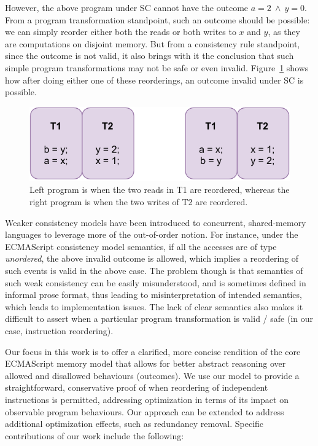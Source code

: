     
    However, the above program under SC cannot have the outcome $a=2\ \wedge\ y=0$. 
    From a program transformation standpoint, such an outcome should be possible: we can simply reorder either both the reads or both writes to $x$ and $y$, as they are computations on disjoint memory. 
    But from a consistency rule standpoint, since the outcome is not valid, it also brings with it the conclusion that such simple program transformations may not be safe or even invalid.
    Figure~\ref{intro:Example2} shows how after doing either one of these reorderings, an outcome invalid under SC is possible. 
    \begin{figure}[H]
        \centering
        \includegraphics[scale=0.7]{Program_Transform_Example.pdf}
        \caption{Left program is when the two reads in T1 are reordered, whereas the right program is when the two writes of T2 are reordered.}
        \label{intro:Example2}
    \end{figure}
    
    
    Weaker consistency models have been introduced to concurrent, shared-memory languages to leverage more of the \textit{}{out-of-order} notion. 
    For instance,  under the ECMAScript consistency model semantics, if all the accesses are of type \textit{unordered}, the above invalid outcome is allowed, which implies a reordering of such events is valid in the above case. 
    The problem though is that semantics of such weak consistency can be easily misunderstood, and is sometimes defined in informal prose format, thus leading to misinterpretation of intended semantics, which leads to implementation issues. 
    The lack of clear semantics also makes it difficult to assert when a particular program transformation is valid / safe (in our case, instruction reordering).
    
    Our focus in this work is to offer a clarified, more concise rendition of the core ECMAScript memory model that allows for better abstract reasoning over allowed and disallowed behaviours (outcomes). 
    We use our model to provide a straightforward, conservative proof of when reordering of independent instructions is permitted, addressing optimization in terms of its impact on observable program behaviours. 
    Our approach can be extended to address additional optimization effects, such as redundancy removal. Specific contributions of our work include the following:
    
